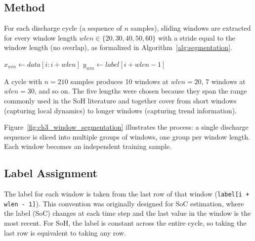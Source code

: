 \subsection{Method}

For each discharge cycle (a sequence of $n$ samples), sliding windows are extracted for every window length $wlen \in \{20, 30, 40, 50, 60\}$ with a stride equal to the window length (no overlap), as formalized in Algorithm~\ref{alg:segmentation}.

\begin{algorithm}
\caption{Multi-length window segmentation. Each discharge cycle is sliced into non-overlapping windows for every window length $wlen \in \{20,30,40,50,60\}$; the label of each window is taken from its last sample.}
\label{alg:segmentation}
\begin{algorithmic}[1]
\State $x_{win} \gets data[i : i + wlen]$
\State $y_{win} \gets label[i + wlen - 1]$
\EndFor
\EndFor
\end{algorithmic}
\end{algorithm}

A cycle with $n = 210$ samples produces 10 windows at $wlen = 20$, 7 windows at $wlen = 30$, and so on. The five lengths were chosen because they span the range commonly used in the SoH literature and together cover from short windows (capturing local dynamics) to longer windows (capturing trend information).

Figure~\ref{fig:ch3_window_segmentation} illustrates the process: a single discharge sequence is sliced into multiple groups of windows, one group per window length. Each window becomes an independent training sample.


\subsection{Label Assignment}

The label for each window is taken from the last row of that window (\texttt{label[i + wlen - 1]}). This convention was originally designed for SoC estimation, where the label (SoC) changes at each time step and the last value in the window is the most recent. For SoH, the label is constant across the entire cycle, so taking the last row is equivalent to taking any row.

